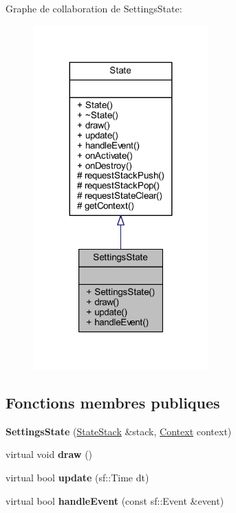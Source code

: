 Graphe de collaboration de Settings\+State\+:\nopagebreak
\begin{figure}[H]
\begin{center}
\leavevmode
\includegraphics[width=191pt]{class_settings_state__coll__graph}
\end{center}
\end{figure}
\subsection*{Fonctions membres publiques}
\begin{DoxyCompactItemize}
\item 
\hypertarget{class_settings_state_a949344118b93b89df8426ff84bac3d3b}{}\label{class_settings_state_a949344118b93b89df8426ff84bac3d3b} 
{\bfseries Settings\+State} (\hyperlink{class_state_stack}{State\+Stack} \&stack, \hyperlink{struct_state_1_1_context}{Context} context)
\item 
\hypertarget{class_settings_state_afb948fe782ad303939a3833030898d5c}{}\label{class_settings_state_afb948fe782ad303939a3833030898d5c} 
virtual void {\bfseries draw} ()
\item 
\hypertarget{class_settings_state_a8b93195e2c3d037cbf4b61add04081c2}{}\label{class_settings_state_a8b93195e2c3d037cbf4b61add04081c2} 
virtual bool {\bfseries update} (sf\+::\+Time dt)
\item 
\hypertarget{class_settings_state_a21fddce7003c26dd485154df18261be5}{}\label{class_settings_state_a21fddce7003c26dd485154df18261be5} 
virtual bool {\bfseries handle\+Event} (const sf\+::\+Event \&event)
\end{DoxyCompactItemize}
